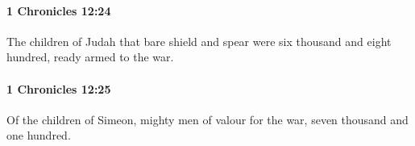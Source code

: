 		\paragraph{1 Chronicles 12:24} %
			\label{1CHRONICLES-12-24}

			The children of Judah that bare shield and spear were six thousand and eight hundred, ready armed to the war.


		\paragraph{1 Chronicles 12:25} %
			\label{1CHRONICLES-12-25}

			Of the children of Simeon, mighty men of valour for the war, seven thousand and one hundred.


